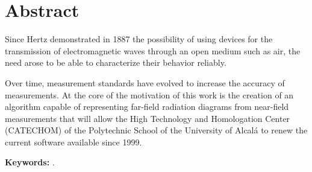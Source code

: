 %
%
%
% 
%
%
%
%

\chapter*{Abstract}
\label{cha:abstract}


Since Hertz demonstrated in 1887 the possibility of using devices for the transmission of electromagnetic waves through an open medium such as air, the need arose to be able to characterize their behavior reliably.

Over time, measurement standards have evolved to increase the accuracy of measurements.  At the core of the motivation of this work is the creation of an algorithm capable of representing far-field radiation diagrams from near-field measurements that will allow the High Technology and Homologation Center (CATECHOM) of the Polytechnic School of the University of Alcalá to renew the current software available since 1999.


\textbf{Keywords:} \myThesisKeywordsEnglish.



